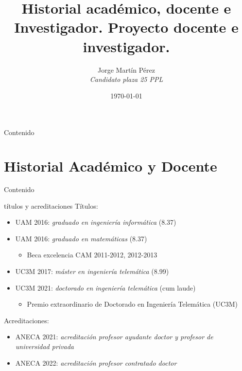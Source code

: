 \documentclass[xcolor=table,xcolor=x11names]{beamer}
\title{Historial académico, docente e Investigador.
Proyecto docente e investigador.}
\date{\today}
\author{Jorge Martín Pérez\\\emph{Candidato plaza 25 PPL}}
\begin{document}
\begin{frame}
\titlepage
\end{frame}

\setcounter{framenumber}{0}


\begin{frame}[allowframebreaks]{Contenido}
    \tableofcontents
\end{frame}



\section{Historial Académico y Docente}
\begin{frame}[allowframebreaks]{Contenido}
    \tableofcontents[currentsection]
\end{frame}


\begin{frame}{\secname}{títulos y acreditaciones}
    Títulos:
    \begin{itemize}
        \item UAM 2016: \emph{graduado en ingeniería informática} (8.37)
        \item UAM 2016: \emph{graduado en matemáticas} (8.37)
            \begin{itemize}
                \item Beca excelencia CAM 2011-2012, 2012-2013
            \end{itemize}
        \item UC3M 2017: \emph{máster en ingeniería telemática} (8.99)
        \item UC3M 2021: \emph{doctorado en ingeniería telemática} (cum laude)
            \begin{itemize}
                \item Premio extraordinario de Doctorado en
                    Ingeniería Telemática (UC3M)
            \end{itemize}
    \end{itemize}
    Acreditaciones:
    \begin{itemize}
        \item ANECA 2021: \emph{acreditación profesor ayudante doctor y profesor de universidad privada}
        \item ANECA 2022: \emph{acreditación profesor
            contratado doctor}
    \end{itemize}
\end{frame}
\end{document}
